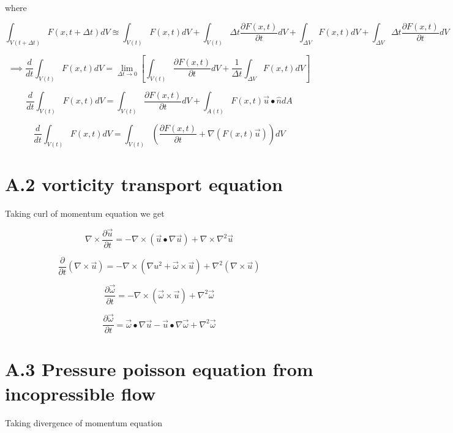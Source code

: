 \documentclass{article}		%
\begin{document}
		where 
		
		$$
		\int_{V(t+\Delta t)} F(x,t+\Delta t) dV \approxeq \int_{V(t)} F(x,t) dV + \int_{V(t)} \Delta t  \frac{\partial F(x,t)}{\partial t} dV + \int_{\Delta V} F(x,t) dV + \int_{\Delta V} \Delta t  \frac{\partial F(x,t)}{\partial t} dV
		$$
		
		$$
		\implies \frac{d}{dt} \int_{V(t)} F(x,t) dV = \lim_{\Delta t \to 0 } \left[ \int_{V(t)}   \frac{\partial F(x,t)}{\partial t} dV +  \frac{1}{\Delta t} \int_{\Delta V} F(x,t) dV \right]
		$$
		
		$$
		\frac{d}{dt} \int_{V(t)} F(x,t) dV = \int_{V(t)}  \frac{\partial F(x,t)}{\partial t} dV +   \int_{A(t)} F(x,t) \vec{u} \bullet \hat{n} dA 
		$$
		
		\begin{equation}
		\frac{d}{dt} \int_{V(t)} F(x,t) dV = \int_{V(t)}  \left( \frac{\partial F(x,t)}{\partial t} +   \nabla \left(F(x,t) \vec{u}\right)  \right) dV 
		\end{equation}

\section*{A.2 vorticity transport equation} 		
	Taking curl of momentum equation we get 
		
	$$
		\nabla \times \frac{\partial  \vec{u} }{\partial t} = - \nabla \times( \vec{u} \bullet \nabla \vec{u}) +\nabla \times \nabla^2 \vec{u} 
	$$	


	$$
	\frac{\partial }{\partial t}(\nabla \times \vec{u} ) = - \nabla \times( \nabla u^2 + \vec{\omega} \times \vec{u} ) + \nabla^2 (\nabla \times \vec{u}) 
	$$	

$$
\frac{\partial \vec{\omega}}{\partial t} = - \nabla \times( \vec{\omega} \times \vec{u} ) + \nabla^2 \vec{\omega} 
$$

\begin{equation}
\frac{\partial \vec{\omega}}{\partial t} = \vec{\omega} \bullet \nabla \vec{u} - \vec{u} \bullet \nabla \vec{\omega} + \nabla^2 \vec{\omega} 
\end{equation}

\newpage

\section*{A.3 Pressure poisson equation from incopressible flow} 		

Taking divergence of momentum equation 
\end{document}
